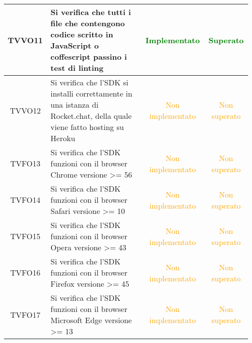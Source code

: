 \begin{center}
\begin{longtable}{|c|>{\centering}m{10cm}|c|c|}
		TVVO11 & Si verifica che tutti i file che contengono codice scritto in JavaScript o coffescript passino i test di linting & \textcolor{Green}{Implementato} & \textcolor{Green}{Superato} \\ \hline
		TVVO12 & Si verifica che l'SDK si installi correttamente in una istanza di Rocket.chat, della quale viene fatto hosting su Heroku & \textcolor{Orange}{Non implementato} & \textcolor{Orange}{Non superato} \\ \hline
		TVFO13 & Si verifica che l'SDK funzioni con il browser Chrome versione >= 56 & \textcolor{Orange}{Non implementato} & \textcolor{Orange}{Non superato} \\ \hline
		TVFO14 & Si verifica che l'SDK funzioni con il browser Safari versione >= 10 & \textcolor{Orange}{Non implementato} & \textcolor{Orange}{Non superato} \\ \hline
		TVFO15 & Si verifica che l'SDK funzioni con il browser Opera versione >= 43 & \textcolor{Orange}{Non implementato} & \textcolor{Orange}{Non superato} \\ \hline
		TVFO16 & Si verifica che l'SDK funzioni con il browser Firefox versione >= 45 & \textcolor{Orange}{Non implementato} & \textcolor{Orange}{Non superato} \\ \hline
		TVFO17 & Si verifica che l'SDK funzioni con il browser Microsoft Edge versione >= 13 & \textcolor{Orange}{Non implementato} & \textcolor{Orange}{Non superato} \\ \hline
	\end{longtable}
\end{center}

